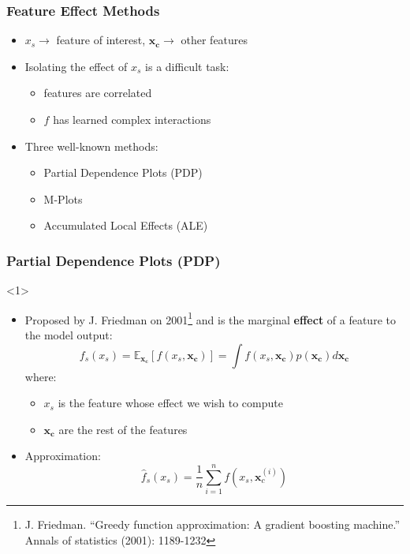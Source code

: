 \documentclass{beamer}
\newcommand{\obf}[1]{{\color{orange} \textbf{#1}}}
\newcommand{\Vx}{\mathbf{x}}
\begin{document}
\begin{frame}
  \frametitle{Feature Effect Methods}
  \begin{itemize}
  \item \(x_s \rightarrow \) feature of interest, \(\bm{x_c} \rightarrow\) other features
  \item Isolating the effect of \(x_s\) is a difficult task:
    \begin{itemize}
    \item features are correlated
      \item \(f\) has learned complex interactions
      \end{itemize}

    \item Three well-known methods:
      \begin{itemize}
      \item Partial Dependence Plots (PDP)
      \item M-Plots
      \item Accumulated Local Effects (ALE)
      \end{itemize}
  \end{itemize}
\end{frame}


\begin{frame}
  \frametitle{Partial Dependence Plots (PDP)}
  \begin{onlyenv}<1>
    \begin{itemize}
    \item Proposed by J. Friedman on 2001\footnote{J. Friedman. ``Greedy
    function approximation: A gradient boosting machine.'' Annals of statistics
    (2001): 1189-1232} and is the marginal \obf{effect} of a feature to the
      model output:
      \begin{equation*}
        f_s(x_s) = \mathbb{E}_{\bm{x_c}}\left[f(x_s, \bm{x_c})\right] =
        \int f(x_s, \bm{x_c}) p(\bm{x_c})d\bm{x_c}
      \end{equation*}
      where:

      \begin{itemize}
      \item $x_s$ is the feature whose effect we wish to compute
      \item $\bm{x_c}$ are the rest of the features
      \end{itemize}

    \item Approximation:
      \begin{equation*}
        \hat{f}_s(x_s) = \frac{1}{n}\sum\limits_{i=1}^{n}f(x_s, \Vx_c^{(i)})
      \end{equation*}
    \end{itemize}
  \end{onlyenv}
\end{frame}
\end{document}
